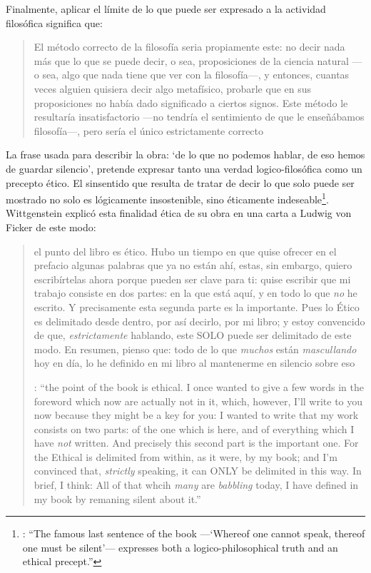 Finalmente, aplicar el límite de lo que puede ser expresado a la actividad filosófica significa que: \blockquote[{\cite[\S6.53]{wittgenstein1922tractatuses}}]{El método correcto de la filosofía seria propiamente este: no decir nada más que lo que se puede decir, o sea, proposiciones de la ciencia natural ---o sea, algo que nada tiene que ver con la filosofía---, y entonces, cuantas veces alguien quisiera decir algo metafísico, probarle que en sus proposiciones no había dado significado a ciertos signos. Este método le resultaría insatisfactorio ---no tendría el sentimiento de que le enseñábamos filosofía---, pero sería el único estrictamente correcto}. La frase usada para describir la obra: \enquote*{de lo que no podemos hablar, de eso hemos de guardar silencio}, pretende expresar tanto una verdad logico-filosófica como un precepto ético. El sinsentido que resulta de tratar de decir lo que solo puede ser mostrado no solo es lógicamente insostenible, sino éticamente indeseable\footnote{\cite[Cf.~][156]{monk1991duty}: \enquote{The famous last sentence of the book ---`Whereof one cannot speak, thereof one must be silent'--- expresses both a logico-philosophical truth and an ethical precept.}}. Wittgenstein explicó esta finalidad ética de su obra en una carta a Ludwig von Ficker de este modo:
\blockquote[{\cite[22--23]{monk2005howto}}: \enquote{the point of the book is ethical. I once wanted to give a few words in the foreword which now are actually not in it, which, however, I'll write to you now because they might be a key for you: I wanted to write that my work consists on two parts: of the one which is here, and of everything which I have \emph{not} written. And precisely this second part is the important one. For the Ethical is delimited from within, as it were, by my book; and I'm convinced that, \emph{strictly} speaking, it can ONLY be delimited in this way. In brief, I think: All of that whcih \emph{many} are \emph{babbling} today, I have defined in my book by remaning silent about it.}]{el punto del libro es ético. Hubo un tiempo en que quise ofrecer en el prefacio algunas palabras que ya no están ahí, estas, sin embargo, quiero escribírtelas ahora porque pueden ser clave para ti: quise escribir que mi trabajo consiste en dos partes: en la que está aquí, y en todo lo que \emph{no} he escrito. Y precisamente esta segunda parte es la importante. Pues lo Ético es delimitado desde dentro, por así decirlo, por mi libro; y estoy convencido de que, \emph{estrictamente} hablando, este SOLO puede ser delimitado de este modo. En resumen, pienso que: todo de lo que \emph{muchos} están \emph{mascullando} hoy en día, lo he definido en mi libro al mantenerme en silencio sobre eso}.

